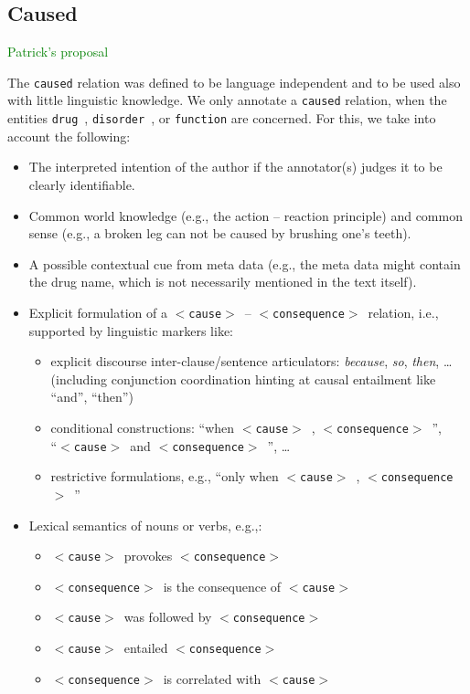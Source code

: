\documentclass[12pt]{article}
\theoremstyle{definition}
\newcommand{\dis}{\texttt{disorder}\ }
\newcommand{\dr}{\texttt{drug}\ }
\newcommand{\cause}{$<$\texttt{cause}$>$\ }
\newcommand{\conseq}{$<$\texttt{consequence}$>$\ }
\begin{document}
\subsection{Caused}\label{rel_caused}

\textcolor{green}{Patrick's proposal}

The \texttt{caused} relation was defined to be language independent and to be used also with little linguistic knowledge.
We only annotate a \texttt{caused} relation, when the entities \dr, \dis, or \texttt{function} are concerned. 
For this, we take into account the following:
\begin{itemize}
    \item The interpreted intention of the author if the annotator(s) judges it to be clearly identifiable.
    \item Common world knowledge (e.g., the action -- reaction principle) and common sense (e.g., a broken leg can not be caused by brushing one's teeth).
    \item A possible contextual cue from meta data (e.g., the meta data might contain the drug name, which is not necessarily mentioned in the text itself).
    \item Explicit formulation of a \cause-- \conseq relation, i.e., supported by linguistic markers like:
    \begin{itemize}
        \item explicit discourse inter-clause/sentence articulators: \textit{because}, \textit{so}, \textit{then}, \ldots (including conjunction coordination hinting at  causal entailment like ``and'', ``then'') %
        \item conditional constructions: ``when \cause , \conseq'',  \\ ``\cause and \conseq'', \ldots
        \item restrictive formulations, e.g., ``only when \cause , \conseq''
    \end{itemize}
    \item Lexical semantics of nouns or verbs, e.g.,:
    \begin{itemize}
        \item \cause  provokes \conseq
        \item \conseq is the consequence of \cause
        \item \cause was followed by \conseq
        \item \cause entailed \conseq
        \item \conseq is correlated with \cause

\end{itemize}
\end{itemize}
\end{document}
